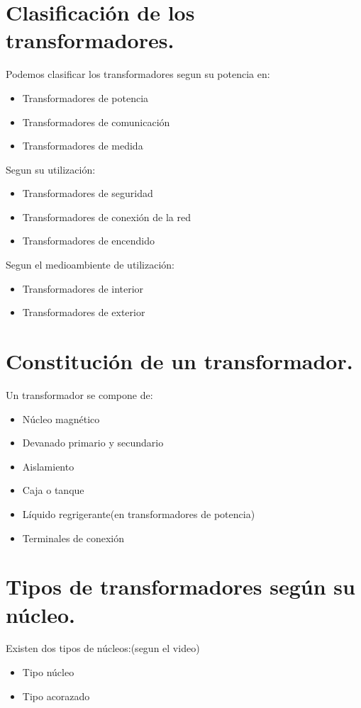 \documentclass{report}
\begin{document}
\section{Clasificación de los transformadores.}
  Podemos clasificar los transformadores segun su potencia en:
    \begin{itemize}
      \item{} Transformadores de potencia
      \item{} Transformadores de comunicación
      \item{} Transformadores de medida
    \end{itemize}
  Segun su utilización:
    \begin{itemize}
      \item{} Transformadores de seguridad
      \item{} Transformadores de conexión de la red
      \item{} Transformadores de encendido
    \end{itemize}
  Segun el medioambiente de utilización:
    \begin{itemize}
      \item{} Transformadores de interior
      \item{} Transformadores de exterior
    \end{itemize}

\section{Constitución de un transformador.}
  Un transformador se compone de:
  \begin{itemize}
    \item{} Núcleo magnético
    \item{} Devanado primario y secundario
    \item{} Aislamiento
    \item{} Caja o tanque
    \item{} Líquido regrigerante(en transformadores de potencia)
    \item{} Terminales de conexión
  \end{itemize}

\section{Tipos de transformadores según su núcleo.}
  Existen dos tipos de núcleos:(segun el video)
  \begin{itemize}
    \item{} Tipo núcleo 
    \item{} Tipo acorazado
  \end{itemize}
\end{document}
